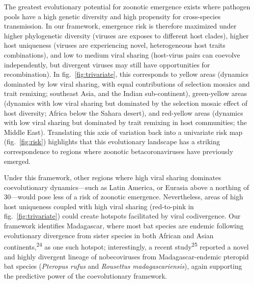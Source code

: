 \documentclass[11pt]{article}
\begin{document}
The greatest evolutionary potential for zoonotic emergence exists where
pathogen pools have a high genetic diversity and high propensity for
cross-species transmission. In our framework, emergence risk is
therefore maximized under higher phylogenetic diversity (viruses are
exposes to different host clades), higher host uniqueness (viruses are
experiencing novel, heterogeneous host traits combinations), and low to
medium viral sharing (host-virus pairs can coevolve independently, but
divergent viruses may still have opportunities for recombination). In
fig.~\ref{fig:trivariate}, this corresponds to yellow areas (dynamics
dominated by low viral sharing, with equal contributions of selection
mosaics and trait remixing; southeast Asia, and the Indian
sub-continent), green-yellow areas (dynamics with low viral sharing but
dominated by the selection mosaic effect of host diversity; Africa below
the Sahara desert), and red-yellow areas (dynamics with low viral
sharing but dominated by trait remixing in host communities; the Middle
East). Translating this axis of variation back into a univariate risk
map (fig.~\ref{fig:risk}) highlights that this evolutionary landscape
has a striking correspondence to regions where zoonotic
betacoronaviruses have previously emerged.

Under this framework, other regions where high viral sharing dominates
coevolutionary dynamics---such as Latin America, or Eurasia above a
northing of 30---would pose less of a risk of zoonotic emergence.
Nevertheless, areas of high host uniqueness coupled with high viral
sharing (red-to-pink in fig.~\ref{fig:trivariate}) could create hotspots
facilitated by viral codivergence. Our framework identifies Madagascar,
where most bat species are endemic following evolutionary divergence
from sister species in both African and Asian
continents,\textsuperscript{24} as one such hotspot; interestingly, a
recent study\textsuperscript{25} reported a novel and highly divergent
lineage of nobecoviruses from Madagascar-endemic pteropid bat species
(\emph{Pteropus rufus} and \emph{Rousettus madagascariensis}), again
supporting the predictive power of the coevolutionary framework.
\end{document}
